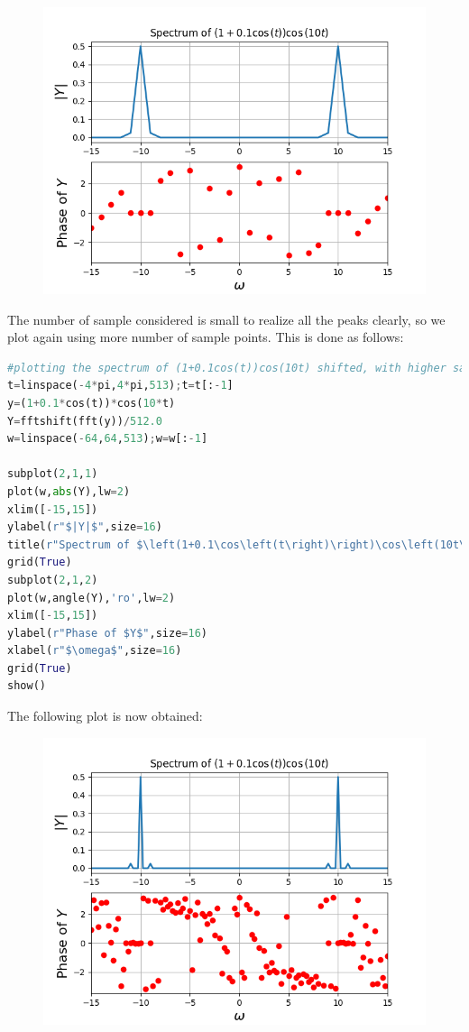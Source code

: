 \documentclass[11pt, a4paper]{article}
\begin{document}
\begin{figure}[H]
    \centering
    \includegraphics[scale = 0.8]{Figure_3.png}
\end{figure}

The number of sample considered is small to realize all the peaks clearly, so we plot again using more number of sample points. This is done as follows:

\begin{lstlisting}[language = Python]
#plotting the spectrum of (1+0.1cos(t))cos(10t) shifted, with higher sampling rate
t=linspace(-4*pi,4*pi,513);t=t[:-1]
y=(1+0.1*cos(t))*cos(10*t)
Y=fftshift(fft(y))/512.0
w=linspace(-64,64,513);w=w[:-1]

subplot(2,1,1)
plot(w,abs(Y),lw=2)
xlim([-15,15])
ylabel(r"$|Y|$",size=16)
title(r"Spectrum of $\left(1+0.1\cos\left(t\right)\right)\cos\left(10t\right)$")
grid(True)
subplot(2,1,2)
plot(w,angle(Y),'ro',lw=2)
xlim([-15,15])
ylabel(r"Phase of $Y$",size=16)
xlabel(r"$\omega$",size=16)
grid(True)
show()
\end{lstlisting}
The following plot is now obtained:

\begin{figure}[H]
    \centering
    \includegraphics[scale = 0.8]{Figure_4.png}
\end{figure}
\end{document}
